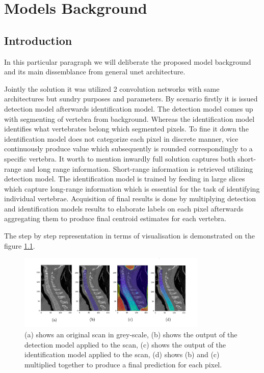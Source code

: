 \chapter{Models Background}
\label{ch:model_background}

\section{Introduction}
In this particular paragraph we will deliberate the proposed model background and its main dissemblance from general unet architecture.

Jointly the solution it was utilized 2 convolution networks with same architectures but sundry purposes and parameters. By scenario firstly it is issued detection model afterwards identification model. The detection model comes up with segmenting of vertebra from background. Whereas the identification model identifies what vertebrates belong which segmented pixels. To fine it down the identification model does not categorize each pixel in discrete manner, vice continuously produce value which subsequently is rounded correspondingly to a specific vertebra. It worth to mention inwardly full solution captures both short-range and long range information. Short-range information is retrieved utilizing detection model. The identification model is trained by feeding in large slices which capture long-range information which is essential for the task of identifying individual vertebrae. Acquisition of final results is done by multiplying detection and identification models results to elaborate labels on each pixel afterwards aggregating them to produce final centroid estimates for each vertebra.

The step by step representation in terms of visualisation is demonstrated on the figure \ref{fig:detection_identification_steps}.

\begin{figure}[h]
    \centering \includegraphics[width=9cm]{images/detection_identification_steps.png}
    \caption {(a) shows an original scan in grey-scale, (b) shows the output of the detection model applied to the scan, (c) shows the output of the identification model applied to the scan, (d) shows (b) and (c) multiplied together to produce a final prediction for each pixel.}
    \label{fig:detection_identification_steps}
\end{figure}

